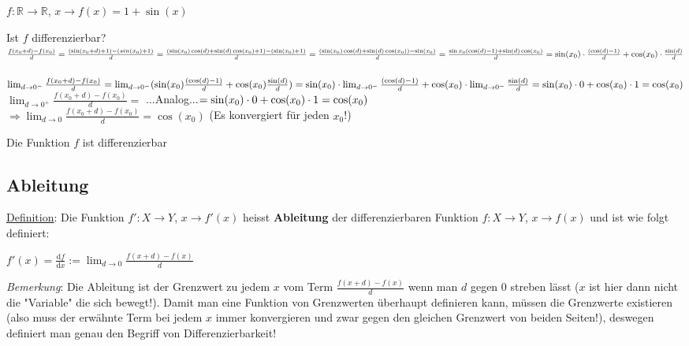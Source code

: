 \documentclass[11pt]{article} %
\begin{document}
$f: \mathbb{R} \rightarrow \mathbb{R}$, $x \rightarrow f(x) = 1 + \sin(x) $

Ist $f$ differenzierbar? \\

$ \frac{f(x_0+d)-f(x_0)}{d} = \frac{(\sin(x_0+d)+1)-(sin(x_0)+1)}{d} = \frac{(\sin(x_0)\cos(d)+\sin(d)\cos(x_0) + 1) - (\sin(x_0)+1)}{d} \\=\frac{(\sin(x_0)\cos(d)+\sin(d)\cos(x_0)) - \sin(x_0)}{d} = \frac{\sin{x_0}(\cos(d)-1)+\sin(d)\cos(x_0)}{d}\\ =\sin(x_0)\cdot\frac{(\cos(d)-1)}{d}+\cos(x_0)\cdot\frac{\sin(d)}{d}$\\\\

$ \lim_{d \rightarrow 0^-} \frac{f(x_0+d)-f(x_0)}{d} =  \lim_{d \rightarrow 0^-} (\sin(x_0)\frac{(\cos(d)-1)}{d}+\cos(x_0)\frac{\sin(d)}{d})\\= \sin(x_0)\cdot\lim_{d \rightarrow 0^-} \frac{(\cos(d)-1)}{d}+\cos(x_0)\cdot\lim_{d \rightarrow 0^-} \frac{\sin(d)}{d} = \sin(x_0) \cdot 0 +\cos(x_0)\cdot1\\ = \cos(x_0) $\\


$ \lim_{d \rightarrow 0^+} \frac{f(x_0+d)-f(x_0)}{d} =$ ...Analog...$= \sin(x_0) \cdot 0 +\cos(x_0)\cdot1 \\ =\cos(x_0)$\\


$\Rightarrow \lim_{d \rightarrow 0} \frac{f(x_0+d)-f(x_0)}{d} =\cos(x_0) $ (Es konvergiert für jeden $x_0$!)

Die Funktion $f$ ist differenzierbar

\subsection{Ableitung}

\underline{Definition}: Die Funktion $f': X \rightarrow Y$, $x \rightarrow f'(x)$ heisst {\bf Ableitung} der differenzierbaren Funktion $f: X \rightarrow Y$, $x \rightarrow f(x)$ und ist wie folgt definiert:
\begin{center}
$f'(x) = \frac{\mathrm{d}f}{\mathrm{d}x} :=  \lim_{d\rightarrow 0} \frac{f(x+d)-f(x)}{d}$\\
\end{center}


\emph{Bemerkung}:  Die Ableitung ist der Grenzwert zu jedem $x$ vom Term $\frac{f(x+d)-f(x)}{d}$ wenn man $d$ gegen $0$ streben lässt ($x$ ist hier dann nicht die "Variable" die sich bewegt!). Damit man eine Funktion von Grenzwerten überhaupt definieren kann, müssen die Grenzwerte existieren (also muss der erwähnte Term bei jedem $x$ immer konvergieren und zwar gegen den gleichen Grenzwert von beiden Seiten!), deswegen definiert man genau den Begriff von Differenzierbarkeit!\\
\end{document}
